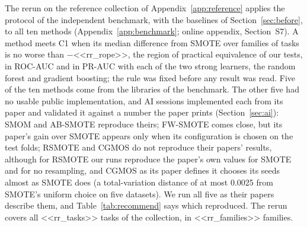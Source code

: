 The rerun on the reference collection of Appendix~\ref{app:reference} applies the protocol of the independent benchmark, with the baselines of Section~\ref{sec:before}, to all ten methods (Appendix~\ref{app:benchmark}; online appendix, Section~S7). A method meets C1 when its median difference from SMOTE over families of tasks is no worse than $-$<<rr_rope>>, the region of practical equivalence of our tests, in ROC-AUC and in PR-AUC with each of the two strong learners, the random forest and gradient boosting; the rule was fixed before any result was read. Five of the ten methods come from the libraries of the benchmark. The other five had no usable public implementation, and AI sessions implemented each from its paper and validated it against a number the paper prints (Section~\ref{sec:ai}): SMOM and AB-SMOTE reproduce theirs; FW-SMOTE comes close, but its paper's gain over SMOTE appears only when its configuration is chosen on the test folds; RSMOTE and CGMOS do not reproduce their papers' results, although for RSMOTE our runs reproduce the paper's own values for SMOTE and for no resampling, and CGMOS as its paper defines it chooses its seeds almost as SMOTE does (a total-variation distance of at most 0.0025 from SMOTE's uniform choice on five datasets). We run all five as their papers describe them, and Table~\ref{tab:recommend} says which reproduced. The rerun covers all <<rr_tasks>> tasks of the collection, in <<rr_families>> families.

